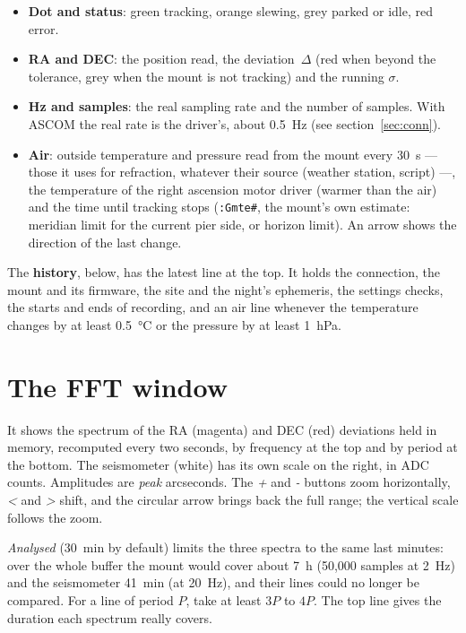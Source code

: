 \begin{itemize}
  \item \textbf{Dot and status}: green tracking, orange slewing, grey parked or
  idle, red error.
  \item \textbf{RA and DEC}: the position read, the deviation~$\Delta$ (red
  when beyond the tolerance, grey when the mount is not tracking) and the
  running $\sigma$.
  \item \textbf{Hz and samples}: the real sampling rate and the number of
  samples. With ASCOM the real rate is the driver's, about 0.5~Hz (see
  section~\ref{sec:conn}).
  \item \textbf{Air}: outside temperature and pressure read from the mount every
  30~s --- those it uses for refraction, whatever their source (weather station,
  script) ---, the temperature of the right ascension motor driver (warmer than the air) and the
  time until tracking stops (\texttt{:Gmte\#}, the mount's own estimate:
  meridian limit for the current pier side, or horizon limit). An arrow shows the direction of the last change.
\end{itemize}

The \textbf{history}, below, has the latest line at the top. It holds the
connection, the mount and its firmware, the site and the night's ephemeris, the
settings checks, the starts and ends of recording, and an air line whenever the
temperature changes by at least 0.5~°C or the pressure by at least 1~hPa.

\chapter{The FFT window}
\label{ch:fftwin}


It shows the spectrum of the RA (magenta) and DEC (red) deviations held in
memory, recomputed every two seconds, by frequency at the top and by period at
the bottom. The seismometer (white) has its own scale on the right, in ADC
counts. Amplitudes are \emph{peak} arcseconds. The \emph{+} and \emph{-}
buttons zoom horizontally, \emph{<} and \emph{>} shift, and the circular
arrow brings back the full range; the vertical scale follows the zoom.

\emph{Analysed} (30~min by default) limits the three spectra to the same last
minutes: over the whole buffer the mount would cover about 7~h (50,000 samples
at 2~Hz) and the seismometer 41~min (at 20~Hz), and their lines could no longer
be compared. For a line of period $P$, take at least $3P$ to $4P$. The top line
gives the duration each spectrum really covers.

